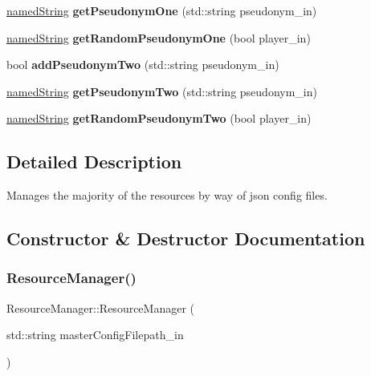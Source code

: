 \begin{DoxyCompactItemize}
\item 
\mbox{\label{class_resource_manager_ab25efa871e58ff6384047af4157fc079}} 
\hyperlink{structnamed_string}{named\+String} {\bfseries get\+Pseudonym\+One} (std\+::string pseudonym\+\_\+in)
\item 
\mbox{\label{class_resource_manager_a8910015ef96595cc9db15826200e1c5e}} 
\hyperlink{structnamed_string}{named\+String} {\bfseries get\+Random\+Pseudonym\+One} (bool player\+\_\+in)
\item 
\mbox{\label{class_resource_manager_ac746f8a059a86aa916ae21e216e62488}} 
bool {\bfseries add\+Pseudonym\+Two} (std\+::string pseudonym\+\_\+in)
\item 
\mbox{\label{class_resource_manager_a47291ec37ddcbc32fb0807c16dec3f23}} 
\hyperlink{structnamed_string}{named\+String} {\bfseries get\+Pseudonym\+Two} (std\+::string pseudonym\+\_\+in)
\item 
\mbox{\label{class_resource_manager_aa99b2a36f97ca76e973656e316d790c4}} 
\hyperlink{structnamed_string}{named\+String} {\bfseries get\+Random\+Pseudonym\+Two} (bool player\+\_\+in)
\end{DoxyCompactItemize}


\subsection{Detailed Description}
Manages the majority of the resources by way of json config files. 

\subsection{Constructor \& Destructor Documentation}
\mbox{\label{class_resource_manager_adad08cf28525bce25c672e985c3d092a}} 
\subsubsection{\texorpdfstring{Resource\+Manager()}{ResourceManager()}}
{\footnotesize\ttfamily Resource\+Manager\+::\+Resource\+Manager (\begin{DoxyParamCaption}\item[{std\+::string}]{master\+Config\+Filepath\+\_\+in }\end{DoxyParamCaption})\hspace{0.3cm}{\ttfamily [inline]}}



